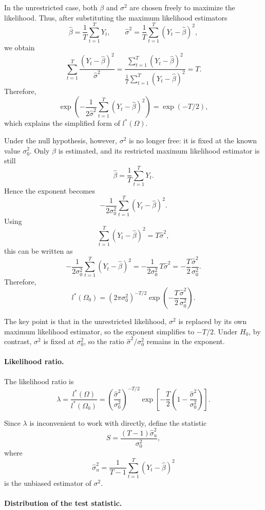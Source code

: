 In the unrestricted case, both $\beta$ and $\sigma^2$ are chosen freely to maximize the likelihood.
Thus, after substituting the maximum likelihood estimators
\[
\hat{\beta} = \frac{1}{T}\sum_{t=1}^T Y_t,
\qquad
\hat{\sigma}^2 = \frac{1}{T}\sum_{t=1}^T (Y_t-\hat{\beta})^2,
\]
we obtain
\[
\sum_{t=1}^T \frac{(Y_t-\hat{\beta})^2}{\hat{\sigma}^2}
=
\frac{\sum_{t=1}^T (Y_t-\hat{\beta})^2}
{\frac{1}{T}\sum_{t=1}^T (Y_t-\hat{\beta})^2}
=
T.
\]
Therefore,
\[
\exp\!\left(
-\frac{1}{2\hat{\sigma}^2}
\sum_{t=1}^T (Y_t-\hat{\beta})^2
\right)
=
\exp(-T/2),
\]
which explains the simplified form of $l^*(\Omega)$.

Under the null hypothesis, however, $\sigma^2$ is no longer free: it is fixed at the known value $\sigma_0^2$.
Only $\beta$ is estimated, and its restricted maximum likelihood estimator is still
\[
\hat{\beta} = \frac{1}{T}\sum_{t=1}^T Y_t.
\]
Hence the exponent becomes
\[
-\frac{1}{2\sigma_0^2}\sum_{t=1}^T (Y_t-\hat{\beta})^2.
\]
Using
\[
\sum_{t=1}^T (Y_t-\hat{\beta})^2 = T\hat{\sigma}^2,
\]
this can be written as
\[
-\frac{1}{2\sigma_0^2}\sum_{t=1}^T (Y_t-\hat{\beta})^2
=
-\frac{1}{2\sigma_0^2}\,T\hat{\sigma}^2
=
-\frac{T}{2}\frac{\hat{\sigma}^2}{\sigma_0^2}.
\]
Therefore,
\[
l^*(\Omega_0)
=
(2\pi\sigma_0^2)^{-T/2}
\exp\!\left(
-\frac{T}{2}\frac{\hat{\sigma}^2}{\sigma_0^2}
\right).
\]

The key point is that in the unrestricted likelihood, $\sigma^2$ is replaced by its own maximum likelihood estimator, so the exponent simplifies to $-T/2$.
Under $H_0$, by contrast, $\sigma^2$ is fixed at $\sigma_0^2$, so the ratio $\hat{\sigma}^2/\sigma_0^2$ remains in the exponent.


\paragraph{Likelihood ratio.}

The likelihood ratio is
\[
\lambda
=
\frac{l^*(\Omega)}{l^*(\Omega_0)}
=
\left(\frac{\hat{\sigma}^2}{\sigma_0^2}\right)^{-T/2}
\exp\!\left[
-\frac{T}{2}\left(1-\frac{\hat{\sigma}^2}{\sigma_0^2}\right)
\right].
\]

Since $\lambda$ is inconvenient to work with directly, define the statistic
\[
S
=
\frac{(T-1)\hat{\sigma}_u^2}{\sigma_0^2},
\]
where
\[
\hat{\sigma}_u^2
=
\frac{1}{T-1}\sum_{t=1}^T (Y_t-\hat{\beta})^2
\]
is the unbiased estimator of $\sigma^2$.

\paragraph{Distribution of the test statistic.}

